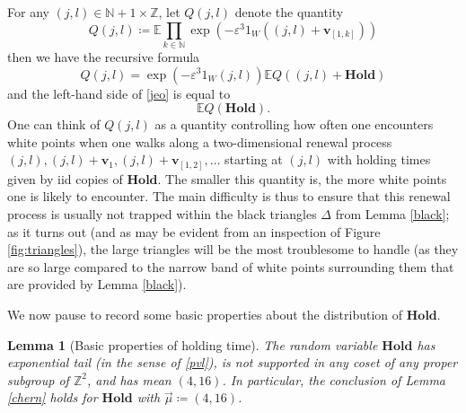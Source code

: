 \documentclass[12pt,a4paper,reqno]{amsart}
\numberwithin{equation}{section}
\theoremstyle{plain}
\newtheorem{lemma}[theorem]{Lemma}
\theoremstyle{definition}
\newcommand\E{\mathbb{E}}
\newcommand\Z{\mathbb{Z}}
\newcommand\N{\mathbb{N}}
\renewcommand\v{\mathbf{v}}
\newcommand\Hold{\mathbf{Hold}}
\newcommand\eps{\varepsilon}
\begin{document}
For any $(j,l) \in \N+1 \times \Z$, let $Q(j,l)$ denote the quantity
\begin{equation}\label{qjl-def}
 Q(j,l) \coloneqq \E \prod_{k \in \N} \exp( - \eps^3 1_W((j,l) + \v_{[1,k]}) )
\end{equation}
then we have the recursive formula
\begin{equation}\label{recurse}
 Q(j,l) = \exp( - \eps^3 1_W(j,l) ) \E Q((j,l) + \Hold)
\end{equation}
and the left-hand side of \eqref{jeo} is equal to
$$ \E Q(\Hold).$$
One can think of $Q(j,l)$ as a quantity controlling how often one encounters white points when one walks along a two-dimensional renewal process $(j,l), (j,l) + \v_1, (j,l)+\v_{[1,2]}, \dots$ starting at $(j,l)$ with holding times given by iid copies of $\Hold$.  The smaller this quantity is, the more white points one is likely to encounter.  The main difficulty is thus to ensure that this renewal process is usually not trapped within the black triangles $\Delta$ from Lemma \ref{black}; as it turns out (and as may be evident from an inspection of Figure \ref{fig:triangles}), the large triangles will be the most troublesome to handle (as they are so large compared to the narrow band of white points surrounding them that are provided by Lemma \ref{black}).

We now pause to record some basic properties about the distribution of $\Hold$.

\begin{lemma}[Basic properties of holding time]\label{Exptail}  The random variable $\Hold$ has exponential tail (in the sense of \eqref{pvl}), is not supported in any coset of any proper subgroup of $\Z^2$, and has mean $(4,16)$.  In particular, the conclusion of Lemma \ref{chern} holds for $\Hold$ with $\vec \mu \coloneqq (4,16)$.
\end{lemma}
\end{document}
